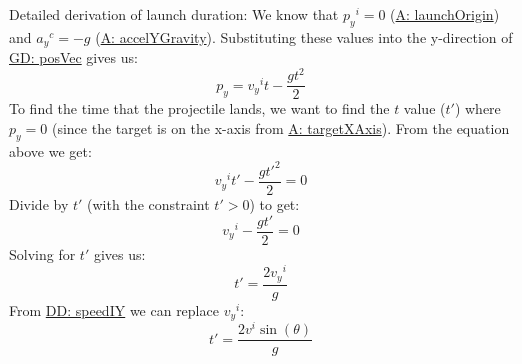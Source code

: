 \documentclass[12pt]{article}
\begin{document}
Detailed derivation of launch duration:
We know that ${{p_{y}}^{i}}=0$ (\hyperref[launchOrigin]{A: launchOrigin}) and ${{a_{y}}^{c}}=-g$ (\hyperref[accelYGravity]{A: accelYGravity}). Substituting these values into the y-direction of \hyperref[GD:posVec]{GD: posVec} gives us:
\begin{displaymath}
{p_{y}}={{v_{y}}^{i}} t-\frac{g t^{2}}{2}
\end{displaymath}
To find the time that the projectile lands, we want to find the $t$ value ($t'$) where ${p_{y}}=0$ (since the target is on the x-axis from \hyperref[targetXAxis]{A: targetXAxis}). From the equation above we get:
\begin{displaymath}
{{v_{y}}^{i}} t'-\frac{g t'^{2}}{2}=0
\end{displaymath}
Divide by $t'$ (with the constraint $t'>0$) to get:
\begin{displaymath}
{{v_{y}}^{i}}-\frac{g t'}{2}=0
\end{displaymath}
Solving for $t'$ gives us:
\begin{displaymath}
t'=\frac{2 {{v_{y}}^{i}}}{g}
\end{displaymath}
From \hyperref[DD:speedIY]{DD: speedIY} we can replace ${{v_{y}}^{i}}$:
\begin{displaymath}
t'=\frac{2 {v^{i}} \sin\left(θ\right)}{g}
\end{displaymath}
\par~
\end{document}
